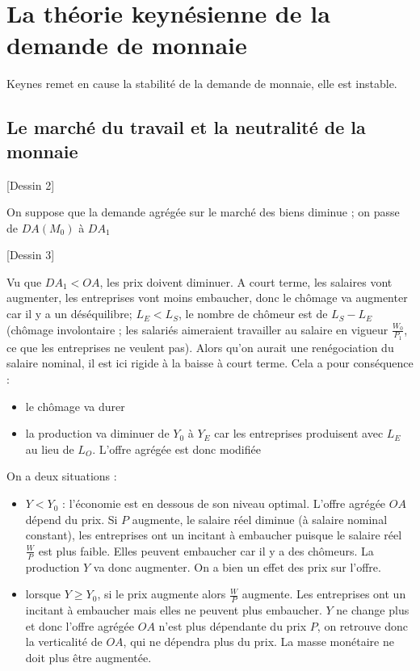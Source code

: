 \section{La théorie keynésienne de la demande de monnaie}

	Keynes remet en cause la stabilité de la demande de monnaie, elle est instable.
	
	\subsection{Le marché du travail et la neutralité de la monnaie}
	
	[Dessin 2]
	
	On suppose que la demande agrégée sur le marché des biens diminue ; on passe de $DA(M_0)$ à $DA_1$
	
	[Dessin 3]
	
	Vu que $DA_1 < OA$, les prix doivent diminuer. A court terme, les salaires vont augmenter, les entreprises vont moins embaucher, donc le chômage va augmenter car il y a un déséquilibre; $L_E < L_S$, le nombre de chômeur est de $L_S - L_E$ (chômage involontaire ; les salariés aimeraient travailler au salaire en vigueur $\frac{W_0}{P_1}$, ce que les entreprises ne veulent pas). Alors qu'on aurait une renégociation du salaire nominal, il est ici rigide à la baisse à court terme. Cela a pour conséquence :
	
	\begin{itemize}
		\item le chômage va durer
		\item la production va diminuer de $Y_0$ à $Y_E$ car les entreprises produisent avec $L_E$ au lieu de $L_O$. L'offre agrégée est donc modifiée
	\end{itemize}
	
	On a deux situations :
	
	\begin{itemize}
		\item $Y < Y_0$ : l'économie est en dessous de son niveau optimal. L'offre agrégée $OA$ dépend du prix. Si $P$ augmente, le salaire réel diminue (à salaire nominal constant), les entreprises ont un incitant à embaucher puisque le salaire réel $\frac{W}{P}$ est plus faible. Elles peuvent embaucher car il y a des chômeurs. La production $Y$ va donc augmenter. On a bien un effet des prix sur l'offre.
		\item lorsque $Y \geq Y_0$, si le prix augmente alors $\frac{W}{P}$ augmente. Les entreprises ont un incitant à embaucher mais elles ne peuvent plus embaucher. $Y$ ne change plus et donc l'offre agrégée $OA$ n'est plus dépendante du prix $P$, on retrouve donc la verticalité de $OA$, qui ne dépendra plus du prix. La masse monétaire ne doit plus être augmentée.
	\end{itemize}
	
